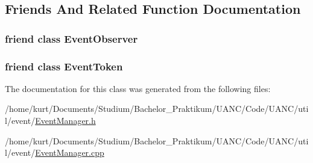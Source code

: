 \subsection{Friends And Related Function Documentation}
\subsubsection[{\texorpdfstring{Event\+Observer}{EventObserver}}]{\setlength{\rightskip}{0pt plus 5cm}friend class {\bf Event\+Observer}\hspace{0.3cm}{\ttfamily [friend]}}\hypertarget{classuanc_1_1util_1_1event_1_1_event_manager_a7512992e19dc2f4613dea5e056e626f9}{}\label{classuanc_1_1util_1_1event_1_1_event_manager_a7512992e19dc2f4613dea5e056e626f9}
\subsubsection[{\texorpdfstring{Event\+Token}{EventToken}}]{\setlength{\rightskip}{0pt plus 5cm}friend class {\bf Event\+Token}\hspace{0.3cm}{\ttfamily [friend]}}\hypertarget{classuanc_1_1util_1_1event_1_1_event_manager_ac94178afc9fbbac2a5735d761b6b2ae5}{}\label{classuanc_1_1util_1_1event_1_1_event_manager_ac94178afc9fbbac2a5735d761b6b2ae5}


The documentation for this class was generated from the following files\+:\begin{DoxyCompactItemize}
\item 
/home/kurt/\+Documents/\+Studium/\+Bachelor\+\_\+\+Praktikum/\+U\+A\+N\+C/\+Code/\+U\+A\+N\+C/util/event/\hyperlink{_event_manager_8h}{Event\+Manager.\+h}\item 
/home/kurt/\+Documents/\+Studium/\+Bachelor\+\_\+\+Praktikum/\+U\+A\+N\+C/\+Code/\+U\+A\+N\+C/util/event/\hyperlink{_event_manager_8cpp}{Event\+Manager.\+cpp}\end{DoxyCompactItemize}
